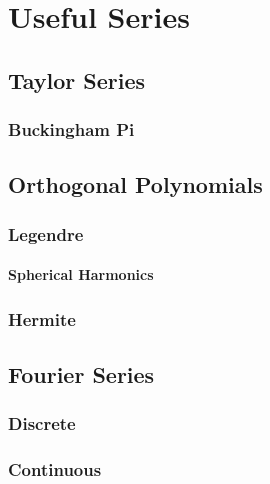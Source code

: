 \chapter{Useful Series}\label{ch:series}
\section{Taylor Series}
\subsection{Buckingham Pi}

\section{Orthogonal Polynomials}
\subsection{Legendre}
\subsubsection{Spherical Harmonics}
\subsection{Hermite}

\section{Fourier Series}
\subsection{Discrete}
\subsection{Continuous}
